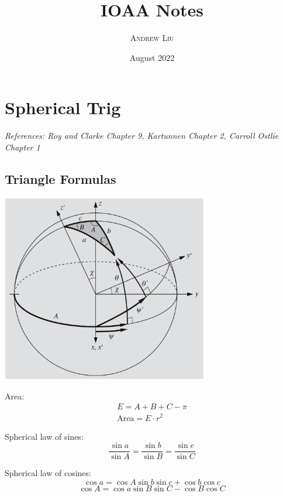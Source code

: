 \documentclass[12pt]{article}
\title{\huge {\fontfamily{lmss}\selectfont
\textbf{IOAA Notes}}}
\author{\scshape \Large Andrew Liu}
\date{{\fontfamily{cmr}\selectfont August 2022}}
\begin{document}
\maketitle

\section{Spherical Trig}

\textit{References: Roy and Clarke Chapter 9, Kartunnen Chapter 2, Carroll Ostlie Chapter 1}

\subsection{Triangle Formulas}

\begin{center}
\includegraphics[width=9cm]{images/triangle.png}
\end{center}

Area:
\begin{align*}
    E = A + B + C - \pi \\
    \text{Area} = E\cdot r^2
\end{align*}

Spherical law of sines: 
\begin{equation*}
    \frac{\sin{a}}{\sin{A}} = \frac{\sin{b}}{\sin{B}} =\frac{\sin{c}}{\sin{C}}
\end{equation*}

Spherical law of cosines: 
\begin{equation*}
    \cos{a} = \cos{A}\sin{b}\sin{c}+\cos{b}\cos{c}
\end{equation*}
\begin{equation*}
    \cos{A} = \cos{a}\sin{B}\sin{C}-\cos{B}\cos{C}
\end{equation*}
\end{document}
